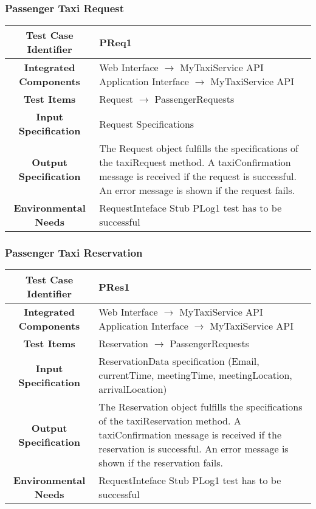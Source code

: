 \documentclass[11pt, a4paper,titlepage]{article}
\begin{document}
	\subsubsection{Passenger Taxi Request}
	\begin{tabularx}{\textwidth}{| c|X|}
		\hline \textbf{Test Case Identifier} & \label{PReq1}PReq1 \\
		\hline \textbf{Integrated Components} &  Web Interface $\rightarrow $ MyTaxiService API \newline 
		Application Interface $\rightarrow $ MyTaxiService API \\
		\hline \textbf{Test Items} & Request $\rightarrow $ PassengerRequests \\
		\hline \textbf{Input Specification} & Request Specifications \\
		\hline \textbf{Output Specification} & 
		The Request object fulfills the specifications of the taxiRequest method.\newline	
		A taxiConfirmation message is received if the request is successful.\newline
		An error message is shown if the request fails. \\
		\hline \textbf{Environmental Needs} & RequestInteface Stub \newline PLog1 test has to be successful \\
		\hline
	\end{tabularx}
	\newline
	\newpage
	\subsubsection{Passenger Taxi Reservation}
	\begin{tabularx}{\textwidth}{| c|X|}
		\hline \textbf{Test Case Identifier} & \label{PRes1}PRes1 \\
		\hline \textbf{Integrated Components} & Web Interface $\rightarrow $ MyTaxiService API \newline 
		Application Interface $\rightarrow $ MyTaxiService API \\
		\hline \textbf{Test Items} & Reservation $\rightarrow $ PassengerRequests \\
		\hline \textbf{Input Specification} & ReservationData specification (Email, currentTime, meetingTime, meetingLocation, arrivalLocation) \\
		\hline \textbf{Output Specification} & 
		The Reservation object fulfills the specifications of the taxiReservation method.\newline
		A taxiConfirmation message is received if the reservation is successful.\newline
		An error message is shown if the reservation fails. \\
		\hline \textbf{Environmental Needs} & RequestInteface Stub \newline PLog1 test has to be successful \\
		\hline
	\end{tabularx}
	\newline
	\newline
\end{document}
